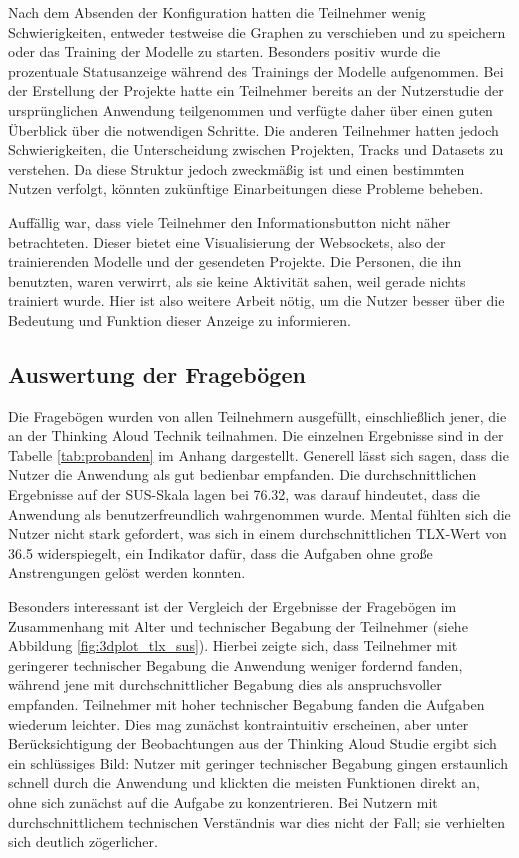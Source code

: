 Nach dem Absenden der Konfiguration hatten die Teilnehmer wenig Schwierigkeiten, entweder testweise die Graphen zu verschieben und zu speichern oder das Training der Modelle zu starten. Besonders positiv wurde die 
prozentuale Statusanzeige während des Trainings der Modelle aufgenommen. Bei der Erstellung der Projekte hatte ein Teilnehmer bereits an der Nutzerstudie der ursprünglichen Anwendung teilgenommen und verfügte daher über 
einen guten Überblick über die notwendigen Schritte. Die anderen Teilnehmer hatten jedoch Schwierigkeiten, die Unterscheidung zwischen Projekten, Tracks und Datasets zu verstehen. Da diese Struktur jedoch zweckmäßig ist 
und einen bestimmten Nutzen verfolgt, könnten zukünftige Einarbeitungen diese Probleme beheben.

Auffällig war, dass viele Teilnehmer den Informationsbutton nicht näher betrachteten. Dieser bietet eine Visualisierung der Websockets, also der trainierenden Modelle und der gesendeten Projekte. Die Personen, die ihn 
benutzten, waren verwirrt, als sie keine Aktivität sahen, weil gerade nichts trainiert wurde. Hier ist also weitere Arbeit nötig, um die Nutzer besser über die Bedeutung und Funktion dieser Anzeige zu informieren.

\subsection{Auswertung der Fragebögen}
\label{sec:results_of_user_experience}
Die Fragebögen wurden von allen Teilnehmern ausgefüllt, einschließlich jener, die an der Thinking Aloud Technik teilnahmen. Die einzelnen Ergebnisse sind in der Tabelle \ref{tab:probanden} im Anhang dargestellt. 
Generell lässt sich sagen, dass die Nutzer die Anwendung als gut bedienbar empfanden. Die durchschnittlichen Ergebnisse auf der SUS-Skala lagen bei 76.32, was darauf hindeutet, dass die Anwendung als 
benutzerfreundlich wahrgenommen wurde. Mental fühlten sich die Nutzer nicht stark gefordert, was sich in einem durchschnittlichen TLX-Wert von 36.5 widerspiegelt, ein Indikator dafür, dass die Aufgaben ohne große Anstrengungen gelöst werden konnten.

Besonders interessant ist der Vergleich der Ergebnisse der Fragebögen im Zusammenhang mit Alter und technischer Begabung der Teilnehmer (siehe Abbildung \ref{fig:3dplot_tlx_sus}). Hierbei zeigte sich, 
dass Teilnehmer mit geringerer technischer Begabung die Anwendung weniger fordernd fanden, während jene mit durchschnittlicher Begabung dies als anspruchsvoller empfanden. Teilnehmer mit hoher technischer 
Begabung fanden die Aufgaben wiederum leichter. Dies mag zunächst kontraintuitiv erscheinen, aber unter Berücksichtigung der Beobachtungen aus der Thinking Aloud Studie ergibt sich ein schlüssiges Bild: Nutzer mit geringer technischer Begabung gingen erstaunlich schnell durch die Anwendung und klickten die meisten Funktionen direkt an, ohne sich zunächst auf die Aufgabe zu konzentrieren. Bei Nutzern mit durchschnittlichem technischen Verständnis war dies nicht der Fall; sie verhielten sich deutlich zögerlicher.


